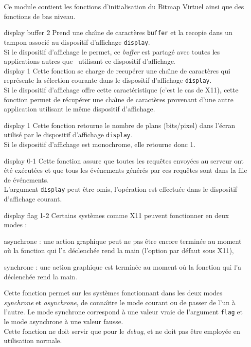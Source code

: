 Ce module contient les fonctions d'initialisation du Bitmap Virtuel ainsi que
des fonctions de bas niveau.

 {display buffer} {2}
Prend une cha\^{\i}ne de caract\`{e}res {\tt buffer} et la recopie dans un tampon
associ\'{e} au dispositif d'affichage {\tt display}.\\
Si le dispositif d'affichage le permet, ce {\em buffer} est partag\'{e} avec
toutes les applications autres que \LeLisp\ utilisant ce dispositif
d'affichage.\\


 {display} {1}
Cette fonction se charge de recup\'{e}rer une cha\^{\i}ne de
caract\`{e}res qui repr\'{e}sente la s\'{e}lection courante dans le dispositif
d'affichage {\tt display}.\\
Si le dispositif d'affichage offre cette caract\'{e}ristique (c'est le cas de
X11), cette fonction permet de r\'{e}cup\'{e}rer une cha\^{\i}ne de caract\`{e}res provenant
d'une autre application  utilisant le m\^{e}me dispositif d'affichage.


 {display} {1}
Cette fonction retourne le nombre de plans (bits/pixel) dans l'\'{e}cran
utilis\'{e} par le dispositif d'affichage {\tt display}.\\
Si le dispositif d'affichage est monochrome, elle retourne
donc 1.


 {display} {0-1}
Cette fonction assure que toutes les requ\^{e}tes envoy\'{e}es au serveur ont \'{e}t\'{e}
ex\'{e}cut\'{e}es et que tous les \'{e}v\'{e}nements g\'{e}n\'{e}r\'{e}s par ces requ\^{e}tes
sont dans la file de \'{e}v\'{e}nements. \\
L'argument {\tt display} peut \^{e}tre omis, l'op\'{e}ration est effectu\'{e}e dans
le dispositif d'affichage courant.


 {display flag} {1-2}
Certains syst\`{e}mes comme X11 peuvent fonctionner en deux modes :
\begin {Itemize}
\item asynchrone : une action graphique peut ne pas \^{e}tre encore termin\'{e}e au
moment o\`{u} la fonction qui l'a d\'{e}clench\'{e}e rend la main (l'option par d\'{e}faut
sous X11),
\item synchrone : une action graphique est termin\'{e}e au moment o\`{u} la
fonction qui l'a d\'{e}clench\'{e}e rend la main.
\end {Itemize}
Cette fonction permet sur les syst\`{e}mes fonctionnant dans les deux modes
{\em synchrone} et {\em asynchrone}, de conna\^{\i}tre le mode courant ou de
passer de l'un \`{a} l'autre. Le mode synchrone correspond \`{a} une valeur vraie
de l'argument {\tt flag} et le mode asynchrone \`{a} une valeur fausse.\\
Cette fonction ne doit servir que pour le {\em debug}, et ne doit pas \^{e}tre
employ\'{e}e en utilisation normale.


